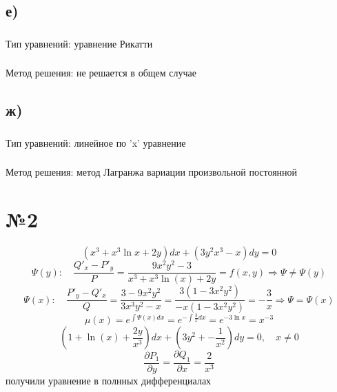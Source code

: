 \documentclass{article}
\begin{document}
\subsection*{е)}
\subsubsection*{} 
Тип уравнений: уравнение Рикатти

\subsubsection*{}
Метод решения: не решается в общем случае

\subsection*{ж)}
\subsubsection*{} 
Тип уравнений: линейное по 'x' уравнение 

\subsubsection*{}
Метод решения: метод Лагранжа вариации произвольной постоянной

\section*{№2}
\begin{equation*}
    (x^3+x^3\ln{x}+2y)dx+(3y^2x^3-x)dy=0
\end{equation*}
\begin{equation*}
    \Psi(y): \quad \frac{Q'_x-P'_y}{P}=
    \frac{9x^2y^2-3}{x^3+x^3\ln(x)+2y}=f(x,y) \Rightarrow \Psi\neq\Psi(y)
\end{equation*}
\begin{equation*}
    \Psi(x): \quad \frac{P'_y-Q'_x}{Q}=
    \frac{3-9x^2y^2}{3x^3y^2-x}=
    \frac{3(1-3x^2y^2)}{-x(1-3x^2y^2)}=-\frac{3}{x}
    \Rightarrow \Psi=\Psi(x)
\end{equation*}
\begin{equation*}
    \mu(x)=e^{\int\Psi(x)dx}=e^{-\int\frac{3}{x}dx}=e^{-3\ln x}=x^{-3}
\end{equation*}
\begin{equation}
    \left(1+\ln(x)+\frac{2y}{x^3}\right)dx+\left(3y^2+-\frac{1}{x^2}\right)dy=0 \label{pd},\quad x\neq0
\end{equation}
\begin{equation*}
    \frac{\partial P_1}{\partial y}=\frac{\partial Q_1}{\partial x}=\frac{2}{x^3}
    \end{equation*}\label{pd}     \quad получили уравнение в полнных дифференциалах
\end{document}
